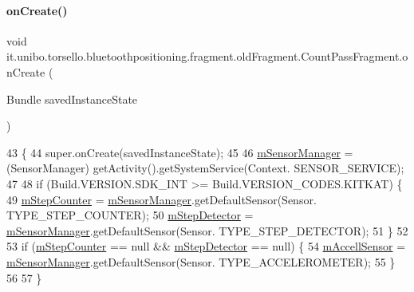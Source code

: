 \paragraph{\texorpdfstring{on\+Create()}{onCreate()}}
{\footnotesize\ttfamily void it.\+unibo.\+torsello.\+bluetoothpositioning.\+fragment.\+old\+Fragment.\+Count\+Pass\+Fragment.\+on\+Create (\begin{DoxyParamCaption}\item[{Bundle}]{saved\+Instance\+State }\end{DoxyParamCaption})}


\begin{DoxyCode}
43                                                     \{
44         super.onCreate(savedInstanceState);
45 
46         \hyperlink{classit_1_1unibo_1_1torsello_1_1bluetoothpositioning_1_1fragment_1_1oldFragment_1_1CountPassFragment_a24e4aafb3d377f25aa09024e196d4d8d_a24e4aafb3d377f25aa09024e196d4d8d}{mSensorManager} = (SensorManager) getActivity().getSystemService(Context.
      SENSOR\_SERVICE);
47 
48         \textcolor{keywordflow}{if} (Build.VERSION.SDK\_INT >= Build.VERSION\_CODES.KITKAT) \{
49             \hyperlink{classit_1_1unibo_1_1torsello_1_1bluetoothpositioning_1_1fragment_1_1oldFragment_1_1CountPassFragment_afd05ecb723e92fbb3d27bf4978e256bc_afd05ecb723e92fbb3d27bf4978e256bc}{mStepCounter} = \hyperlink{classit_1_1unibo_1_1torsello_1_1bluetoothpositioning_1_1fragment_1_1oldFragment_1_1CountPassFragment_a24e4aafb3d377f25aa09024e196d4d8d_a24e4aafb3d377f25aa09024e196d4d8d}{mSensorManager}.getDefaultSensor(Sensor.
      TYPE\_STEP\_COUNTER);
50             \hyperlink{classit_1_1unibo_1_1torsello_1_1bluetoothpositioning_1_1fragment_1_1oldFragment_1_1CountPassFragment_a83913867971bc949eeff6aa7780cbff2_a83913867971bc949eeff6aa7780cbff2}{mStepDetector} = \hyperlink{classit_1_1unibo_1_1torsello_1_1bluetoothpositioning_1_1fragment_1_1oldFragment_1_1CountPassFragment_a24e4aafb3d377f25aa09024e196d4d8d_a24e4aafb3d377f25aa09024e196d4d8d}{mSensorManager}.getDefaultSensor(Sensor.
      TYPE\_STEP\_DETECTOR);
51         \}
52 
53         \textcolor{keywordflow}{if} (\hyperlink{classit_1_1unibo_1_1torsello_1_1bluetoothpositioning_1_1fragment_1_1oldFragment_1_1CountPassFragment_afd05ecb723e92fbb3d27bf4978e256bc_afd05ecb723e92fbb3d27bf4978e256bc}{mStepCounter} == null && \hyperlink{classit_1_1unibo_1_1torsello_1_1bluetoothpositioning_1_1fragment_1_1oldFragment_1_1CountPassFragment_a83913867971bc949eeff6aa7780cbff2_a83913867971bc949eeff6aa7780cbff2}{mStepDetector} == null) \{
54             \hyperlink{classit_1_1unibo_1_1torsello_1_1bluetoothpositioning_1_1fragment_1_1oldFragment_1_1CountPassFragment_a5ceea3320c4813a465731b5f8cd36ce2_a5ceea3320c4813a465731b5f8cd36ce2}{mAccellSensor} = \hyperlink{classit_1_1unibo_1_1torsello_1_1bluetoothpositioning_1_1fragment_1_1oldFragment_1_1CountPassFragment_a24e4aafb3d377f25aa09024e196d4d8d_a24e4aafb3d377f25aa09024e196d4d8d}{mSensorManager}.getDefaultSensor(Sensor.
      TYPE\_ACCELEROMETER);
55         \}
56 
57     \}
\end{DoxyCode}
